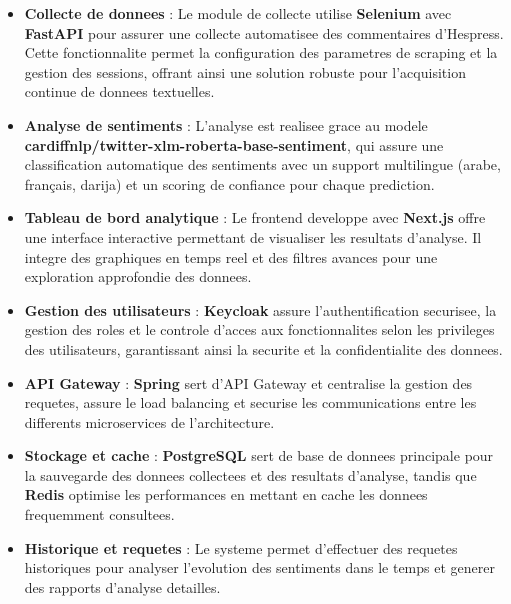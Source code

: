 \begin{itemize}
    \item \textbf{Collecte de donnees} : Le module de collecte utilise \textbf{Selenium} avec \textbf{FastAPI} pour assurer une collecte automatisee des commentaires d'Hespress. Cette fonctionnalite permet la configuration des parametres de scraping et la gestion des sessions, offrant ainsi une solution robuste pour l'acquisition continue de donnees textuelles.
    
    \item \textbf{Analyse de sentiments} : L'analyse est realisee grace au modele \textbf{cardiffnlp/twitter-xlm-roberta-base-sentiment}, qui assure une classification automatique des sentiments avec un support multilingue (arabe, français, darija) et un scoring de confiance pour chaque prediction.
    
    \item \textbf{Tableau de bord analytique} : Le frontend developpe avec \textbf{Next.js} offre une interface interactive permettant de visualiser les resultats d'analyse. Il integre des graphiques en temps reel et des filtres avances pour une exploration approfondie des donnees.
    
    \item \textbf{Gestion des utilisateurs} : \textbf{Keycloak} assure l'authentification securisee, la gestion des roles et le controle d'acces aux fonctionnalites selon les privileges des utilisateurs, garantissant ainsi la securite et la confidentialite des donnees.
    
    \item \textbf{API Gateway} : \textbf{Spring} sert d'API Gateway et centralise la gestion des requetes, assure le load balancing et securise les communications entre les differents microservices de l'architecture.
    
    \item \textbf{Stockage et cache} : \textbf{PostgreSQL} sert de base de donnees principale pour la sauvegarde des donnees collectees et des resultats d'analyse, tandis que \textbf{Redis} optimise les performances en mettant en cache les donnees frequemment consultees.
    
    \item \textbf{Historique et requetes} : Le systeme permet d'effectuer des requetes historiques pour analyser l'evolution des sentiments dans le temps et generer des rapports d'analyse detailles.
\end{itemize}

